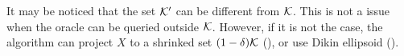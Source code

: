
It may be noticed that the set $\mathcal{K}'$ can be different from $\mathcal{K}$. This is not a issue when the oracle can be queried outside $\mathcal{K}$. However, if it is not the case, the algorithm can project $X$ to a shrinked set $(1-\delta)\mathcal{K}$ (\cite{flaxman2005online}), or use Dikin ellipsoid (\cite{AbHaRa08}).

